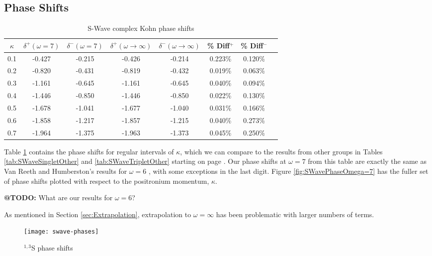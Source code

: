 \documentclass[Dissertation.tex]{subfiles}
\begin{document}
\subsection{Phase Shifts}

\begin{table}[H]
\centering
\begin{tabular}{c c c c c c c c}
\toprule
$\kappa$ & $\delta^+ (\omega = 7)$ & $\delta^- (\omega = 7)$ & $\delta^+ (\omega \rightarrow \infty)$ & $\delta^- (\omega \rightarrow \infty)$ & \% Diff$^+$ & \% Diff$^-$ \\
\midrule
0.1 & -0.427 & -0.215 & -0.426 & -0.214 & 0.223\% & 0.120\% \\
0.2 & -0.820 & -0.431 & -0.819 & -0.432 & 0.019\% & 0.063\% \\
0.3 & -1.161 & -0.645 & -1.161 & -0.645 & 0.040\% & 0.094\% \\
0.4 & -1.446 & -0.850 & -1.446 & -0.850 & 0.022\% & 0.130\% \\
0.5 & -1.678 & -1.041 & -1.677 & -1.040 & 0.031\% & 0.166\% \\
0.6 & -1.858 & -1.217 & -1.857 & -1.215 & 0.040\% & 0.273\% \\
0.7 & -1.964 & -1.375 & -1.963 & -1.373 & 0.045\% & 0.250\% \\
\bottomrule
\end{tabular}
\caption{S-Wave complex Kohn phase shifts}
\label{tab:SWavePhase}
\end{table}

Table \ref{tab:SWavePhase} contains the phase shifts for regular intervals of $\kappa$, which we can compare to the results from other groups in Tables \ref{tab:SWaveSingletOther} and \ref{tab:SWaveTripletOther} starting on page \pageref{tab:SWaveSingletOther}.  Our phase shifts at $\omega = 7$ from this table are exactly the same as Van Reeth and Humberston's results for $\omega = 6$ \cite{VanReeth2003}, with some exceptions in the last digit.  Figure \ref{fig:SWavePhaseOmega=7} has the fuller set of phase shifts plotted with respect to the positronium momentum, $\kappa$.

\textbf{@TODO:} What are our results for $\omega = 6$?

As mentioned in Section \ref{sec:Extrapolation}, extrapolation to $\omega = \infty$ has been problematic with larger numbers of terms.

\begin{figure}[H]
	\centering
	\texttt{[image: swave-phases]}
	\caption{$^{1,3}$S phase shifts}
	\label{fig:SWavePhase}
\end{figure}
\end{document}

